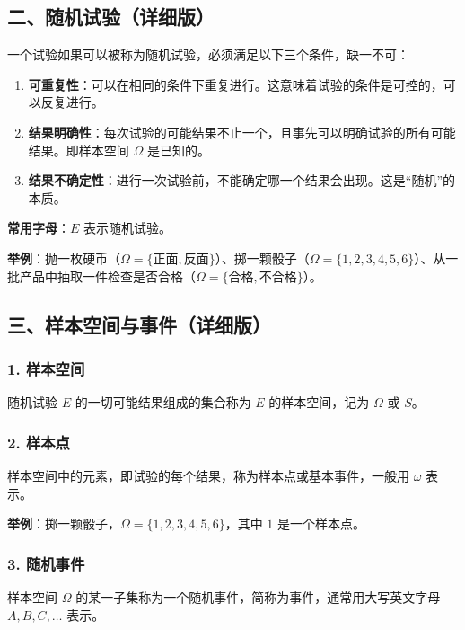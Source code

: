 \documentclass[12pt,a4paper]{ctexart}
\begin{document}
\subsection{二、随机试验（详细版）}

一个试验如果可以被称为随机试验，必须满足以下三个条件，缺一不可：
\begin{enumerate}[noitemsep]
    \item \textbf{可重复性}：可以在相同的条件下重复进行。这意味着试验的条件是可控的，可以反复进行。
    \item \textbf{结果明确性}：每次试验的可能结果不止一个，且事先可以明确试验的所有可能结果。即样本空间 $\Omega$ 是已知的。
    \item \textbf{结果不确定性}：进行一次试验前，不能确定哪一个结果会出现。这是“随机”的本质。
\end{enumerate}

\textbf{常用字母}：$E$ 表示随机试验。

\textbf{举例}：抛一枚硬币（$\Omega = \{正面, 反面\}$）、掷一颗骰子（$\Omega = \{1,2,3,4,5,6\}$）、从一批产品中抽取一件检查是否合格（$\Omega = \{合格, 不合格\}$）。

\subsection{三、样本空间与事件（详细版）}

\subsubsection{1. 样本空间}
随机试验 $E$ 的一切可能结果组成的集合称为 $E$ 的样本空间，记为 $\Omega$ 或 $S$。

\subsubsection{2. 样本点}
样本空间中的元素，即试验的每个结果，称为样本点或基本事件，一般用 $\omega$ 表示。

\textbf{举例}：掷一颗骰子，$\Omega = \{1,2,3,4,5,6\}$，其中 $1$ 是一个样本点。

\subsubsection{3. 随机事件}
样本空间 $\Omega$ 的某一子集称为一个随机事件，简称为事件，通常用大写英文字母 $A, B, C, \dots$ 表示。
\end{document}
